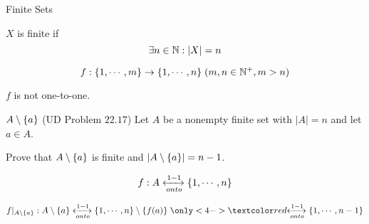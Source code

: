 \begin{frame}{}
  \centerline{\LARGE Finite Sets}

  \vspace{0.50cm}

  \pause
  \begin{quote}
    \begin{center}
      {\large {}}
    \end{center}
  \end{quote}
\end{frame}


\begin{frame}{}
  \begin{definition}[Finite]
    $X$ is finite if
    \[
      \exists n \in \mathbb{N}: |X| = n
    \]
  \end{definition}

  \pause
  \vspace{0.60cm}
  \begin{theorem}
    \[
      f: \{1, \cdots, m\} \to \{1, \cdots, n\} \; (m,n \in \mathbb{N}^{+}, m > n)
    \]

    $f$ is not one-to-one.
  \end{theorem}
\end{frame}

\begin{frame}{}
  \begin{exampleblock}{$A \setminus \{a\}$ (UD Problem $22.17$)}
    Let $A$ be a nonempty finite set with $|A| = n$ and let $a \in A$.

    Prove that $A \setminus \{a\}$ is finite and $|A \setminus \{a\}| = n - 1$.
  \end{exampleblock}

  \pause
  \[
    f: A \xleftrightarrow[onto]{1-1} \{1, \cdots, n\}
  \]

  \pause
  \[
    f|_{A \setminus \set{a}}: A \setminus \set{a} \xleftrightarrow[onto]{1-1} \set{1, \cdots, n} \setminus \set{f(a)} \;\only<4->{\red{\xleftrightarrow[onto]{1-1}\set{1, \cdots, n - 1}}}
  \]
\end{frame}

